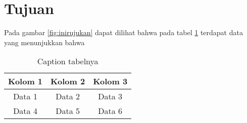 \section*{Tujuan}
\indent
Pada gambar \ref{fig:inirujukan} dapat dilihat bahwa pada tabel \ref{tab:labeltabel} terdapat data yang menunjukkan bahwa \lipsum[1]

\begin{table}[h]
  \centering
  \caption{Caption tabelnya}
  \label{tab:labeltabel}
  \begin{tabular}{|c|c|c|}
    \hline
    Kolom 1 & Kolom 2 & Kolom 3 \\
    \hline
    Data 1  & Data 2  & Data 3  \\
    Data 4  & Data 5  & Data 6  \\
    \hline
  \end{tabular}
\end{table}